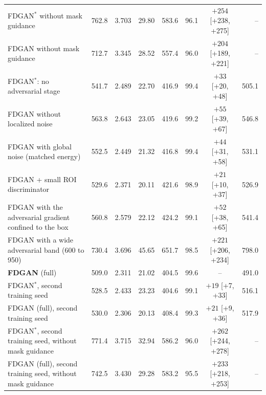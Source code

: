 \begin{center}
\begin{minipage}{\textwidth}
{\begin{tabular}{lrrrrrcr}
FDGAN$^{\ast}$ without mask guidance & 762.8 & 3.703 & 29.80 & 583.6 & 96.1 & $+254$ [+238, +275] & -- \\
FDGAN without mask guidance & 712.7 & 3.345 & 28.52 & 557.4 & 96.0 & $+204$ [+189, +221] & -- \\
FDGAN$^{\ast}$: no adversarial stage & 541.7 & 2.489 & 22.70 & 416.9 & 99.4 & $+33$ [+20, +48] & 505.1 \\
FDGAN without localized noise & 563.8 & 2.643 & 23.05 & 419.6 & 99.2 & $+55$ [+39, +67] & 546.8 \\
FDGAN with global noise (matched energy) & 552.5 & 2.449 & 21.32 & 416.8 & 99.4 & $+44$ [+31, +58] & 531.1 \\
FDGAN + small ROI discriminator & 529.6 & 2.371 & 20.11 & 421.6 & 98.9 & $+21$ [+10, +37] & 526.9 \\
FDGAN with the adversarial gradient confined to the box & 560.8 & 2.579 & 22.12 & 424.2 & 99.1 & $+52$ [+38, +65] & 541.4 \\
FDGAN with a wide adversarial band (600 to 950) & 730.4 & 3.696 & 45.65 & 651.7 & 98.5 & $+221$ [+206, +234] & 798.0 \\
\textbf{FDGAN} (full) & 509.0 & 2.311 & 21.02 & 404.5 & 99.6 & -- & 491.0 \\
FDGAN$^{\ast}$, second training seed & 528.5 & 2.433 & 23.23 & 404.6 & 99.1 & $+19$ [+7, +33] & 516.1 \\
FDGAN (full), second training seed & 530.0 & 2.306 & 20.13 & 408.4 & 99.3 & $+21$ [+9, +36] & 517.9 \\
FDGAN$^{\ast}$, second training seed, without mask guidance & 771.4 & 3.715 & 32.94 & 586.2 & 96.0 & $+262$ [+244, +278] & -- \\
FDGAN (full), second training seed, without mask guidance & 742.5 & 3.430 & 29.28 & 583.2 & 95.5 & $+233$ [+218, +253] & -- \\
\bottomrule
\end{tabular}}
\end{minipage}
\end{center}


